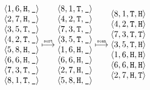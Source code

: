 \begin{align*}
  \begin{matrix}
    \langle 1, 6, \text{\tt H}, \text{\tt \_} \rangle \\
    \langle 2, 7, \text{\tt H}, \text{\tt \_} \rangle \\
    \langle 3, 5, \text{\tt T}, \text{\tt \_} \rangle \\
    \langle 4, 2, \text{\tt T}, \text{\tt \_} \rangle \\
    \langle 5, 8, \text{\tt H}, \text{\tt \_} \rangle \\
    \langle 6, 6, \text{\tt H}, \text{\tt \_} \rangle \\
    \langle 7, 3, \text{\tt T}, \text{\tt \_} \rangle \\
    \langle 8, 1, \text{\tt T}, \text{\tt \_} \rangle \\
  \end{matrix}
  \stackrel{\text{\tiny \tt sort}}{\longmapsto}
  \begin{matrix}
    \langle 8, 1, \text{\tt T}, \text{\tt \_} \rangle \\
    \langle 4, 2, \text{\tt T}, \text{\tt \_} \rangle \\
    \langle 7, 3, \text{\tt T}, \text{\tt \_} \rangle \\
    \langle 3, 5, \text{\tt T}, \text{\tt \_} \rangle \\
    \langle 1, 6, \text{\tt H}, \text{\tt \_} \rangle \\
    \langle 6, 6, \text{\tt H}, \text{\tt \_} \rangle \\
    \langle 2, 7, \text{\tt H}, \text{\tt \_} \rangle \\
    \langle 5, 8, \text{\tt H}, \text{\tt \_} \rangle \\
  \end{matrix}
  \stackrel{\text{\tiny \tt scan}}{\longmapsto}
  \begin{matrix}
    \langle 8, 1, \text{\tt T}, \text{\tt H} \rangle \\
    \langle 4, 2, \text{\tt T}, \text{\tt H} \rangle \\
    \langle 7, 3, \text{\tt T}, \text{\tt T} \rangle \\
    \langle 3, 5, \text{\tt T}, \text{\tt H} \rangle \\
    \langle 1, 6, \text{\tt H}, \text{\tt H} \rangle \\
    \langle 6, 6, \text{\tt H}, \text{\tt H} \rangle \\
    \langle 2, 7, \text{\tt H}, \text{\tt T} \rangle \\

\end{matrix}
\end{align*}
